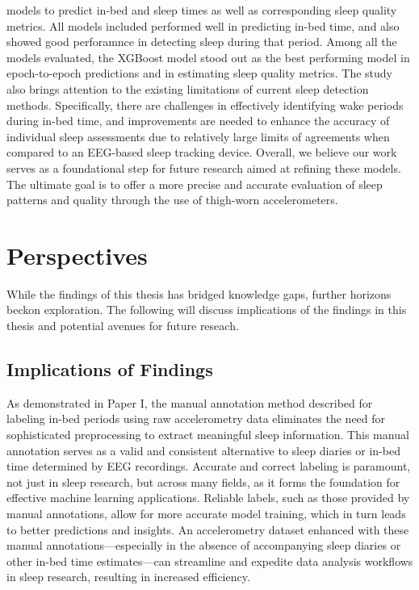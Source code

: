 \documentclass[
  10pt,
]{scrbook}
\begin{document}
\begin{itemize}
  models to predict in-bed and sleep times as well as corresponding
  sleep quality metrics. All models included performed well in
  predicting in-bed time, and also showed good perforamnce in detecting
  sleep during that period. Among all the models evaluated, the XGBoost
  model stood out as the best performing model in epoch-to-epoch
  predictions and in estimating sleep quality metrics. The study also
  brings attention to the existing limitations of current sleep
  detection methods. Specifically, there are challenges in effectively
  identifying wake periods during in-bed time, and improvements are
  needed to enhance the accuracy of individual sleep assessments due to
  relatively large limits of agreements when compared to an EEG-based
  sleep tracking device. Overall, we believe our work serves as a
  foundational step for future research aimed at refining these models.
  The ultimate goal is to offer a more precise and accurate evaluation
  of sleep patterns and quality through the use of thigh-worn
  accelerometers.
\end{itemize}

\hypertarget{perspectives}{%
\chapter{Perspectives}\label{perspectives}}

While the findings of this thesis has bridged knowledge gaps, further
horizons beckon exploration. The following will discuss implications of
the findings in this thesis and potential avenues for future reseach.

\hypertarget{implications-of-findings}{%
\section{Implications of Findings}\label{implications-of-findings}}

As demonstrated in Paper I, the manual annotation method described for
labeling in-bed periods using raw accelerometry data eliminates the need
for sophisticated preprocessing to extract meaningful sleep information.
This manual annotation serves as a valid and consistent alternative to
sleep diaries or in-bed time determined by EEG recordings. Accurate and
correct labeling is paramount, not just in sleep research, but across
many fields, as it forms the foundation for effective machine learning
applications. Reliable labels, such as those provided by manual
annotations, allow for more accurate model training, which in turn leads
to better predictions and insights. An accelerometry dataset enhanced
with these manual annotations---especially in the absence of
accompanying sleep diaries or other in-bed time estimates---can
streamline and expedite data analysis workflows in sleep research,
resulting in increased efficiency.
\end{document}
